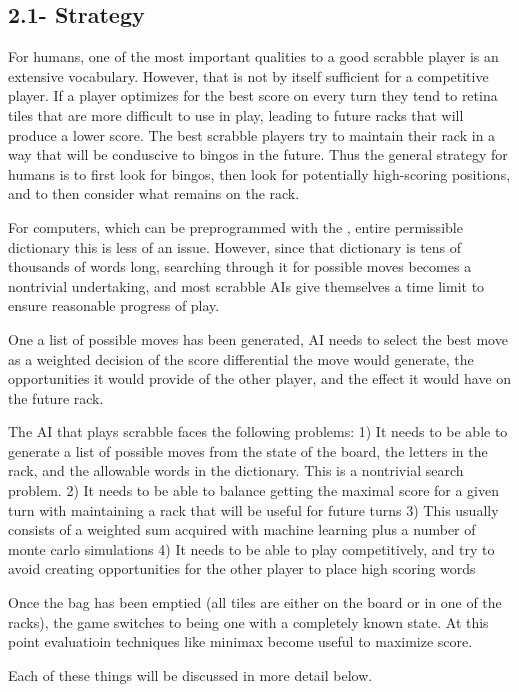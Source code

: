 \documentclass[12pt]{article}
\begin{document}
\subsection*{2.1- Strategy}

For humans, one of the most important qualities to a good scrabble player is an extensive vocabulary. However, that is not by itself sufficient for a competitive player. If a player optimizes for the best score on every turn they tend to retina tiles that are more difficult to use in play, leading to future racks that will produce a lower score. The best scrabble players try to maintain their rack in a way that will be conduscive to bingos in the future. Thus the general strategy for humans is to first look for bingos, then look for potentially high-scoring positions, and to then consider what remains on the rack. 

For computers, which can be preprogrammed with the , entire permissible dictionary this is less of an issue. However, since that dictionary is tens of thousands of words long, searching through it for possible moves becomes a nontrivial undertaking, and most scrabble AIs give themselves a time limit to ensure reasonable progress of play. 

One a list of possible moves has been generated, AI needs to select the best move as a weighted decision of the score differential the move would generate, the opportunities it would provide of the other player, and the effect it would have on the future rack. 

The AI that plays scrabble faces the following problems: 
	1) It needs to be able to generate a list of possible moves from the state of the board, the letters in the rack, and the allowable words in the dictionary. This is a nontrivial search problem. 
	2) It needs to be able to balance getting the maximal score for a given turn with maintaining a rack that will be useful for future turns
	3) This usually consists of a weighted sum acquired with machine learning plus a number of monte carlo simulations		
	4) It needs to be able to play competitively, and try to avoid creating opportunities for the other player to place high scoring words


Once the bag has been emptied (all tiles are either on the board or in one of the racks), the game switches to being one with a completely known state. At this point evaluatioin techniques like minimax become useful to maximize score. 

Each of these things will be discussed in more detail below. 
\end{document}
